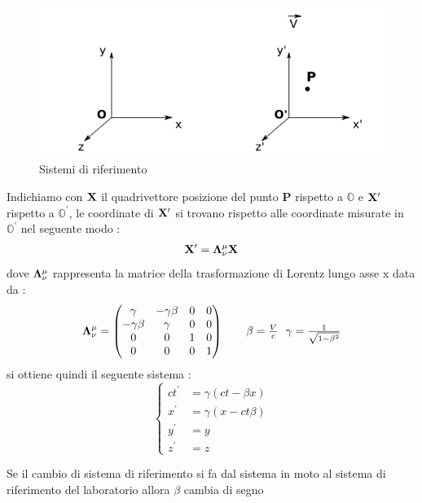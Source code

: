 \begin{figure}[!h]
        \centering 
        \includegraphics[scale=0.8]{SistemaRiferimento}
        \caption{Sistemi di riferimento}
\end{figure}
Indichiamo con $\vb{X}$ il quadrivettore posizione del punto \textbf{P} rispetto a $\mathbb O$ e $\vb{X^\prime}$ rispetto a $\mathbb O^\prime$, le coordinate di 
$\vb{X^\prime}$ si trovano rispetto alle coordinate misurate in $\mathbb O^\prime$ nel seguente modo : 
\begin{align*}
        \vectorbold{X^\prime} = \vb{\Lambda^{\mu}_{\nu}} \vb{X} 
\end{align*} 
dove $\vb{\Lambda^{\mu}_{\nu}}$ rappresenta la matrice della trasformazione di Lorentz lungo asse x data da : 
\begin{align*}
        \vb{\Lambda^{\mu}_{\nu}} = \begin{pmatrix} \gamma & -\gamma\beta & 0 & 0 \\ -\gamma\beta & \gamma & 0 & 0 \\ 0 & 0 & 1 & 0 \\ 0 & 0 & 0 & 1 \end{pmatrix} \tag*{$\beta = \frac{V}{c}$ \ $\gamma = \frac{1}{\sqrt{1-\beta^2}}$}
\end{align*}
si ottiene quindi il seguente sistema : 
\begin{equation*}
\left\{ \begin{aligned}
        ct^{\prime}&=\gamma(ct - \beta x) \\
        x^{\prime}&= \gamma( x - ct\beta ) \\
        y^{\prime}&= y \\
        z^{\prime} &= z
  \end{aligned}
  \right.
\end{equation*}
\begin{tcolorbox}[colback=red!5!white,colframe=red!50!black,title=ATTENZIONE !]
Se il cambio di sistema di riferimento si fa dal sistema in moto al sistema di riferimento del laboratorio allora $\beta$ cambia di segno 
\end{tcolorbox}
\newpage
